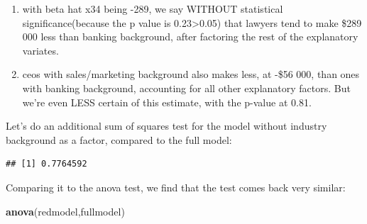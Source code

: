 \documentclass[
]{article}
\newenvironment{Shaded}{\begin{snugshade}}{\end{snugshade}}
\newcommand{\DecValTok}[1]{\textcolor[rgb]{0.00,0.00,0.81}{#1}}
\newcommand{\FunctionTok}[1]{\textcolor[rgb]{0.13,0.29,0.53}{\textbf{#1}}}
\newcommand{\NormalTok}[1]{#1}
\newcommand{\OtherTok}[1]{\textcolor[rgb]{0.56,0.35,0.01}{#1}}
\newcommand{\SpecialCharTok}[1]{\textcolor[rgb]{0.81,0.36,0.00}{\textbf{#1}}}
\providecommand{\tightlist}{%
  \setlength{\itemsep}{0pt}\setlength{\parskip}{0pt}}
\begin{document}
\begin{enumerate}
\def\labelenumi{\roman{enumi})}
\tightlist
\item
  with beta hat x34 being -289, we say WITHOUT statistical
  significance(because the p value is 0.23\textgreater0.05) that lawyers
  tend to make \$289 000 less than banking background, after factoring
  the rest of the explanatory variates.
\item
  ceos with sales/marketing background also makes less, at -\$56 000,
  than ones with banking background, accounting for all other
  explanatory factors. But we're even LESS certain of this estimate,
  with the p-value at 0.81.
\end{enumerate}

Let's do an additional sum of squares test for the model without
industry background as a factor, compared to the full model:

\begin{Shaded}
\end{Shaded}

\begin{verbatim}
## [1] 0.7764592
\end{verbatim}

Comparing it to the anova test, we find that the test comes back very
similar:

\begin{Shaded}
\begin{Highlighting}[]
\FunctionTok{anova}\NormalTok{(redmodel,fullmodel)}
\end{Highlighting}
\end{Shaded}
\end{document}

